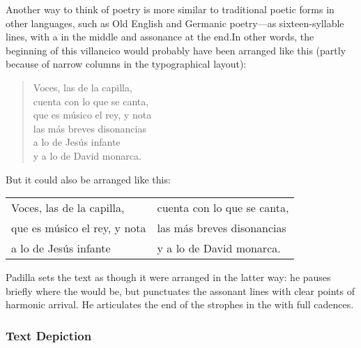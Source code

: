 Another way to think of  poetry is more similar to traditional
poetic forms in other languages, such as Old English and Germanic poetry---as
sixteen-syllable lines, with a  in the middle and assonance at the
end.
In other words, the beginning of this villancico would probably have been
arranged like this (partly because of narrow columns in the typographical
layout):

\begin{blockquotation}
\begin{verse}
    Voces, las de la capilla,\\
    cuenta con lo que se canta,\\
    que es músico el rey, y nota\\
    las más breves disonancias\\
    a lo de Jesús infante\\
    y a lo de David monarca.
\end{verse}
\end{blockquotation}

But it could also be arranged like this:
\begin{blockquotation}
\begin{tabular}{l@{\quad}l}
    Voces, las de la capilla, & cuenta con lo que se canta,\\
    que es músico el rey, y nota & las más breves disonancias\\
    a lo de Jesús infante  & y a lo de David monarca.
\end{tabular}
\end{blockquotation}

Padilla sets the text as though it were arranged in the latter way: he pauses
briefly where the  would be, but punctuates the assonant lines
with clear points of harmonic arrival.
He articulates the end of the strophes in the  with full
cadences.



\subsubsection{Text Depiction}




